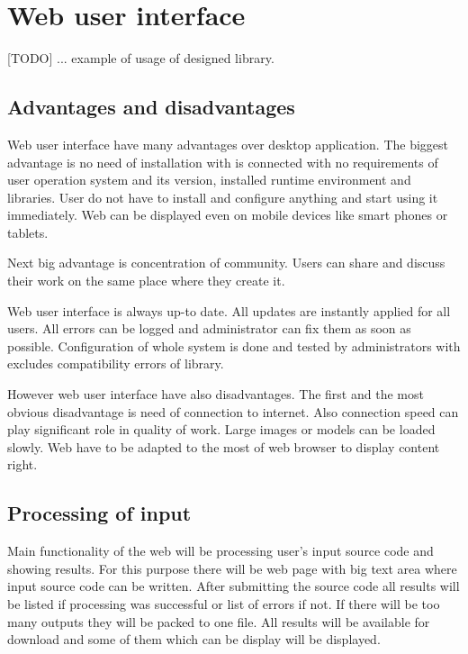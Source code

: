 
\section{Web user interface}

[TODO]
... example of usage of designed library.

\subsection{Advantages and disadvantages}

Web user interface have many advantages over desktop application.
The biggest advantage is no need of installation with is connected with no requirements of user operation system and its version, installed runtime environment and libraries.
User do not have to install and configure anything and start using it immediately.
Web can be displayed even on mobile devices like smart phones or tablets.

Next big advantage is concentration of community.
Users can share and discuss their work on the same place where they create it.

Web user interface is always up-to date.
All updates are instantly applied for all users.
All errors can be logged and administrator can fix them as soon as possible.
Configuration of whole system is done and tested by administrators with excludes compatibility errors of library.

However web user interface have also disadvantages.
The first and the most obvious disadvantage is need of connection to internet.
Also connection speed can play significant role in quality of work.
Large images or models can be loaded slowly.
Web have to be adapted to the most of web browser to display content right.


\subsection{Processing of input}

Main functionality of the web will be processing user's input source code and showing results.
For this purpose there will be web page with big text area where input source code can be written.
After submitting the source code all results will be listed if processing was successful or list of errors if not.
If there will be too many outputs they will be packed to one file.
All results will be available for download and some of them which can be display will be displayed.


